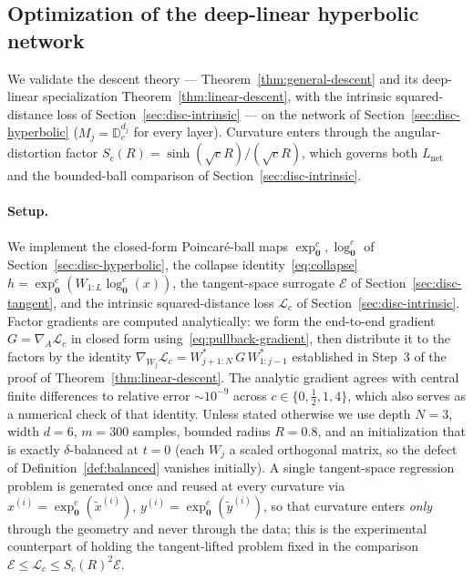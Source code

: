 \documentclass[letterpaper]{article}
\newcommand{\D}{\mathbb{D}}      %
\newcommand{\exps}{\exp_{\mathbf{0}}^c}
\newcommand{\logs}{\log_{\mathbf{0}}^c}
\begin{document}
\subsection{Optimization of the deep-linear hyperbolic network}
\label{sec:exp-opt}

We validate the descent theory --- Theorem~\ref{thm:general-descent} and its
deep-linear specialization Theorem~\ref{thm:linear-descent}, with the
intrinsic squared-distance loss of Section~\ref{sec:disc-intrinsic} --- on
the network of Section~\ref{sec:disc-hyperbolic} ($M_j=\D^{d_j}_c$ for every
layer). Curvature enters through the angular-distortion factor
$S_c(R)=\sinh(\sqrt c R)/(\sqrt c R)$, which governs both $L_{\mathrm{net}}$
and the bounded-ball comparison of Section~\ref{sec:disc-intrinsic}.

\paragraph{Setup.}
We implement the closed-form Poincar\'e-ball maps $\exps,\logs$ of
Section~\ref{sec:disc-hyperbolic}, the collapse
identity~\eqref{eq:collapse} $h = \exps(W_{1:L}\logs(x))$, the
tangent-space surrogate $\mathcal E$ of Section~\ref{sec:disc-tangent},
and the intrinsic squared-distance loss $\mathcal L_c$ of
Section~\ref{sec:disc-intrinsic}. Factor gradients are computed
analytically: we form the end-to-end gradient $G = \nabla_A \mathcal L_c$
in closed form using~\eqref{eq:pullback-gradient}, then distribute it to
the factors by the identity
$\nabla_{W_j}\mathcal L_c = W_{j+1:N}^{*}\, G\, W_{1:j-1}^{*}$ established
in Step~3 of the proof of Theorem~\ref{thm:linear-descent}. The analytic
gradient agrees with central finite differences to relative error
$\sim\!10^{-9}$ across $c \in \{0,\tfrac12,1,4\}$, which also serves as a
numerical check of that identity. Unless stated otherwise we use depth
$N=3$, width $d=6$, $m=300$ samples, bounded radius $R=0.8$, and an
initialization that is exactly $\delta$-balanced at $t=0$ (each $W_j$ a
scaled orthogonal matrix, so the defect of
Definition~\ref{def:balanced} vanishes initially). A single
tangent-space regression problem is generated once and reused at every
curvature via $x^{(i)} = \exps(\tilde x^{(i)})$,
$y^{(i)} = \exps(\tilde y^{(i)})$, so that curvature enters
\emph{only} through the geometry and never through the data; this is the
experimental counterpart of holding the tangent-lifted problem fixed in
the comparison $\mathcal E \le \mathcal L_c \le S_c(R)^2\mathcal E$.
\end{document}

